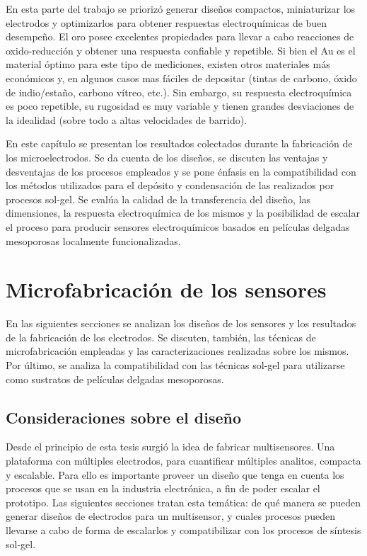 	En esta parte del trabajo se priorizó generar diseños compactos, miniaturizar los electrodos y optimizarlos para obtener respuestas electroquímicas de buen desempeño. El oro posee excelentes propiedades para llevar a cabo reacciones de oxido-reducción y obtener una respuesta confiable y repetible. Si bien el Au es el material óptimo para este tipo de mediciones, existen otros materiales más económicos y, en algunos casos mas fáciles de depositar (tintas de carbono, óxido de indio/estaño, carbono vítreo, etc.). Sin embargo, su respuesta electroquímica es poco repetible, su rugosidad es muy variable y tienen grandes desviaciones de la idealidad (sobre todo a altas velocidades de barrido).\cite{Wi2000,Villullas2000}

	En este capítulo se presentan los resultados colectados durante la fabricación de los microelectrodos. Se da cuenta de los diseños, se discuten las ventajas y desventajas de los procesos empleados y se pone énfasis en la compatibilidad con los métodos utilizados para el depósito y condensación de las \pdm\space realizados por procesos sol-gel. Se evalúa la calidad de la transferencia del diseño, las dimensiones, la respuesta electroquímica de los mismos y la posibilidad de escalar el proceso para producir sensores electroquímicos basados en películas delgadas mesoporosas localmente funcionalizadas.
	
\section{Microfabricación de los sensores}\label{sec:microfabricaci_n_de_los_sensores}
		
	 	 En las siguientes secciones se analizan los diseños de los sensores y los resultados de la fabricación de los electrodos. Se discuten, también, las técnicas de microfabricación empleadas y las caracterizaciones realizadas sobre los mismos. Por último, se analiza la compatibilidad con las técnicas sol-gel para utilizarse como sustratos de películas delgadas mesoporosas.

  		\subsection{Consideraciones sobre el diseño}\label{sec:diseno}

			 Desde el principio de esta tesis surgió la idea de fabricar multisensores. Una plataforma con múltiples electrodos, para cuantificar múltiples analitos, compacta y escalable. Para ello es importante proveer un diseño que tenga en cuenta los procesos que se usan en la industria electrónica, a fin de poder escalar el prototipo. Las siguientes secciones tratan esta temática: de qué manera se pueden generar diseños de electrodos para un multisensor, y cuales procesos pueden llevarse a cabo de forma de escalarlos y compatibilizar con los procesos de síntesis sol-gel.

